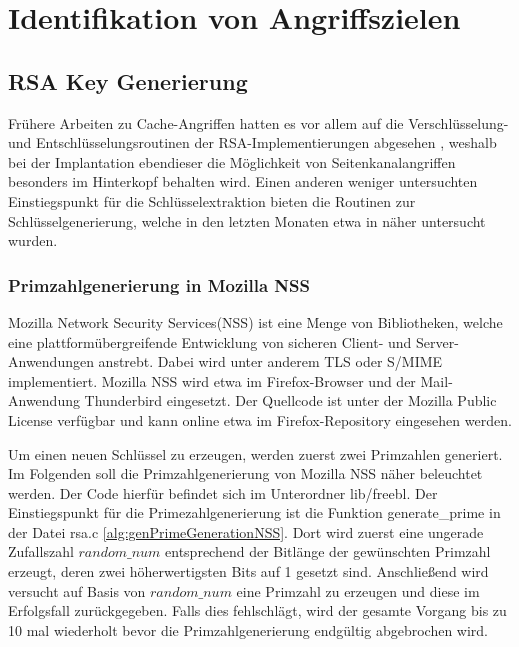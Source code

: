 \chapter{Identifikation von Angriffszielen}
\label{chapter:results}

\section{RSA Key Generierung}

Frühere Arbeiten zu Cache-Angriffen hatten es vor allem auf die Verschlüsselung- und Entschlüsselungsroutinen der RSA-Implementierungen abgesehen \cite{FlushReload, CacheBleedOpenSSLRSA}, weshalb bei der Implantation ebendieser die Möglichkeit von Seitenkanalangriffen besonders im Hinterkopf behalten wird.
Einen anderen weniger untersuchten Einstiegspunkt für die Schlüsselextraktion bieten die Routinen zur Schlüsselgenerierung, welche in den letzten Monaten etwa in \cite{RSAKeyGeneration2} näher untersucht wurden.

\subsection{Primzahlgenerierung in Mozilla NSS}

Mozilla Network Security Services(NSS) ist eine Menge von Bibliotheken, welche eine plattformübergreifende Entwicklung von sicheren Client- und Server-Anwendungen anstrebt. Dabei wird unter anderem TLS oder S/MIME implementiert. Mozilla NSS wird etwa im Firefox-Browser und der Mail-Anwendung Thunderbird eingesetzt.
Der Quellcode ist unter der Mozilla Public License verfügbar und kann online etwa im Firefox-Repository \cite{MozillaDXR} eingesehen werden.

Um einen neuen Schlüssel zu erzeugen, werden zuerst zwei Primzahlen generiert. 
Im Folgenden soll die Primzahlgenerierung von Mozilla NSS näher beleuchtet werden.
Der Code hierfür befindet sich im Unterordner lib/freebl.
Der Einstiegspunkt für die Primezahlgenerierung ist die Funktion generate_prime in der Datei rsa.c \ref{alg:genPrimeGenerationNSS}.
Dort wird zuerst eine ungerade Zufallszahl $random\_num$ entsprechend der Bitlänge der gewünschten Primzahl erzeugt, deren zwei höherwertigsten Bits auf 1 gesetzt sind.
Anschließend wird versucht auf Basis von $random\_num$ eine Primzahl zu erzeugen und diese im Erfolgsfall zurückgegeben.
Falls dies fehlschlägt, wird der gesamte Vorgang bis zu 10 mal wiederholt bevor die Primzahlgenerierung endgültig abgebrochen wird.

